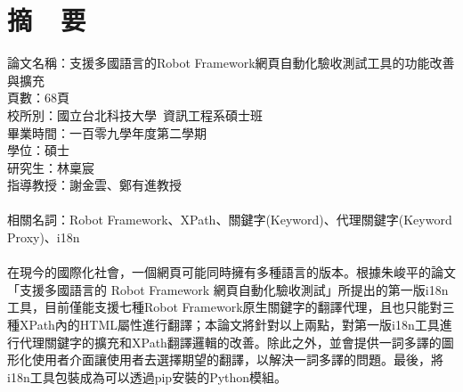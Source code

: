 \chapter*{摘~~要}


\noindent
論文名稱：支援多國語言的Robot Framework網頁自動化驗收測試工具的功能改善與擴充\\
頁數：68頁\\
校所別：國立台北科技大學~資訊工程系碩士班\\
畢業時間：一百零九學年度第二學期\\
學位：碩士\\
研究生：林稟宸\\
指導教授：謝金雲、鄭有進教授\\
\hspace*{\fill}\\
\noindent
相關名詞：Robot Framework、XPath、關鍵字(Keyword)、代理關鍵字(Keyword Proxy)、i18n\\
\hspace*{\fill}\\
%
\indent
在現今的國際化社會，一個網頁可能同時擁有多種語言的版本。根據朱峻平的論文「支援多國語言的 Robot Framework 網頁自動化驗收測試」所提出的第一版i18n工具，目前僅能支援七種Robot Framework原生關鍵字的翻譯代理，且也只能對三種XPath內的HTML屬性進行翻譯；本論文將針對以上兩點，對第一版i18n工具進行代理關鍵字的擴充和XPath翻譯邏輯的改善。除此之外，並會提供一詞多譯的圖形化使用者介面讓使用者去選擇期望的翻譯，以解決一詞多譯的問題。最後，將i18n工具包裝成為可以透過pip安裝的Python模組。
